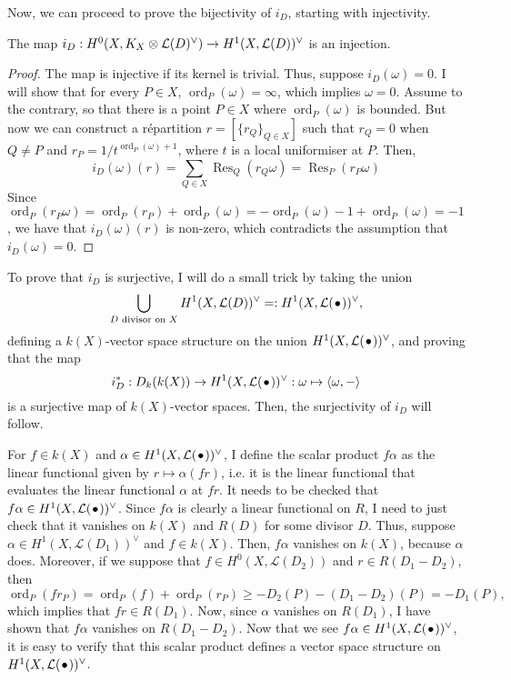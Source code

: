 \documentclass[12pt]{article}
\DeclareMathOperator{\ord}{ord}
\DeclareMathOperator{\res}{Res}
\begin{document}
Now, we can proceed to prove the bijectivity of $i_{D}$, starting with
injectivity.
\begin{prop}\label{prop:injectivity}
  The map $i_{D}:H^0(X,K_X\otimes\mathcal{L}(D)^{\vee})\to H^{1}(X,\mathcal{L}(D))^{\vee}$ is an injection.
\end{prop}
\begin{proof}
  The map is injective if its kernel is trivial. Thus, suppose
  $i_{D}(\omega)=0$. I will show that for every $P\in X$,
  $\ord_{P}(\omega)=\infty$, which implies $\omega=0$.
  Assume to the contrary, so that there is a point $P\in X$ where
  $\ord_{P}(\omega)$ is bounded. But now we can construct a r\'epartition
  $r=[\{r_{Q}\}_{Q\in X}]$ such that $r_{Q}=0$ when $Q\neq P$ and
  $r_{P}=1/t^{\ord_{P}(\omega)+1}$, where $t$ is a local uniformiser at $P$.
  Then,
  \[
    i_{D}(\omega)(r)=\sum_{Q\in X}\res_{Q}(r_{Q}\omega)=\res_{P}(r_{P}\omega)
  \]
  Since $\ord_{P}(r_{P}\omega)=\ord_{P}(r_{P})+\ord_{P}(\omega)
  =-\ord_{P}(\omega)-1+\ord_{P}(\omega)=-1$, we have that $i_{D}(\omega)(r)$ is
  non-zero, which contradicts the assumption that $i_{D}(\omega)=0$.
\end{proof}

To prove that $i_{D}$ is surjective, I will do a small trick by taking
the union
\[
  \bigcup_{D\text{ divisor on }X}H^{1}(X,\mathcal{L}(D))^{\vee}=:H^1(X,\mathcal{L}(\kern.08em\bullet\kern.08em))^{\vee},
\]
defining a $k(X)$-vector space structure on the union $H^1(X,\mathcal{L}(\kern.08em\bullet\kern.08em))^{\vee}$,
and proving that the map
\[
  i_{D}^{\ast}:D_{k}(k(X))\to H^1(X,\mathcal{L}(\kern.08em\bullet\kern.08em))^{\vee}:\omega\mapsto \langle\omega, -\rangle
\]
is a surjective map of $k(X)$-vector spaces. Then, the surjectivity
of $i_{D}$ will follow.

For $f\in k(X)$ and $\alpha\in H^1(X,\mathcal{L}(\kern.08em\bullet\kern.08em))^{\vee}$, I define the scalar product
$f\alpha$ as the linear functional given by $r\mapsto\alpha(fr)$,
i.e. it is the linear functional that evaluates the linear
functional $\alpha$ at $fr$. It needs to be checked that $f\alpha\in H^1(X,\mathcal{L}(\kern.08em\bullet\kern.08em))^{\vee}$.
Since $f\alpha$ is clearly a linear functional on $R$, I need to just check
that it vanishes on $k(X)$ and $R(D)$ for some divisor $D$. Thus, suppose
$\alpha\in H^{1}(X,\mathcal{L}(D_{1}))^{\vee}$ and $f\in k(X)$. Then, $f\alpha$
vanishes on $k(X)$, because $\alpha$ does. Moreover, if we suppose
that $f\in H^{0}(X,\mathcal{L}(D_{2}))$ and $r\in R(D_{1}-D_{2})$, then
\[
  \ord_{P}(fr_{P})=\ord_{P}(f)+\ord_{P}(r_{P})\geq -D_{2}(P)-(D_{1}-D_{2})(P)
  =-D_{1}(P),
\]
which implies that $fr\in R(D_{1})$. Now, since $\alpha$ vanishes on
$R(D_{1})$, I have shown that $f\alpha$ vanishes on $R(D_{1}-D_{2})$.
Now that we see $f\alpha\in H^1(X,\mathcal{L}(\kern.08em\bullet\kern.08em))^{\vee}$, it is easy to verify that this
scalar product defines a vector space structure on $H^1(X,\mathcal{L}(\kern.08em\bullet\kern.08em))^{\vee}$.
\end{document}
